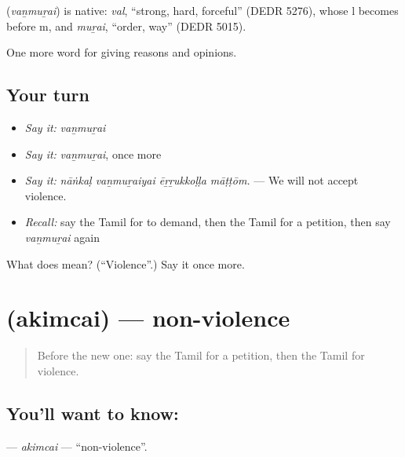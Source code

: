 \begin{cousinweb}
\textbf{} (\emph{vaṉmuṟai}) is native: \emph{val}, \textquotedblleft{}strong, hard, forceful\textquotedblright{} (DEDR 5276), whose l becomes  before m, and \emph{muṟai}, \textquotedblleft{}order, way\textquotedblright{} (DEDR 5015).
\end{cousinweb}

\begin{grammarlens}[title={What you've built}]
One more word for giving reasons and opinions.
\end{grammarlens}

\subsection*{Your turn}
\begin{itemize}
\raggedright
  \item \emph{Say it:} \emph{vaṉmuṟai}
  \item \emph{Say it:} \emph{vaṉmuṟai}, once more
  \item \emph{Say it:} \emph{nāṅkaḷ vaṉmuṟaiyai ēṟṟukkoḷḷa māṭṭōm.} — We will not accept violence.
  \item \emph{Recall:} say the Tamil for to demand, then the Tamil for a petition, then say \emph{vaṉmuṟai} again
\end{itemize}

\begin{tcolorbox}[breakable,colback=teal!4,colframe=teal!35!black,title={Before you move on}]
What does  mean? (\textquotedblleft{}Violence\textquotedblright{}.) Say it once more.
\end{tcolorbox}
\section[\texorpdfstring{\ta{அகிம்சை} (akimcai)}{அகிம்சை (akimcai)}]{ (akimcai) — non-violence}

\label{lesson:TA-C377-akimcai}



\begin{quote}
Before the new one: say the Tamil for a petition, then the Tamil for violence.
\end{quote}

\subsection*{You'll want to know: }
\textbf{} — \emph{akimcai} — \textquotedblleft{}non-violence\textquotedblright{}.

